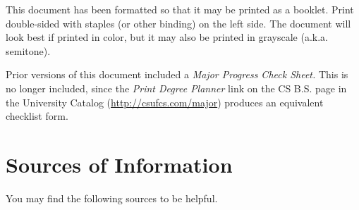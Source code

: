\documentclass{book}
\newcommand{\shrunkurl}[1]{\url{http://csufcs.com/#1}}
\begin{document}
This document has been formatted so that it may be printed as a booklet. Print double-sided with staples (or other binding) on the left side. The document will look best if printed in color, but it may also be printed in grayscale (a.k.a. semitone).

Prior versions of this document included a \emph{Major Progress Check Sheet.} This is no longer included, since the \emph{Print Degree Planner} link on the CS B.S. page in the University Catalog (\shrunkurl{major}) produces an equivalent checklist form.

\chapter{Sources of Information}

You may find the following sources to be helpful.
\end{document}
